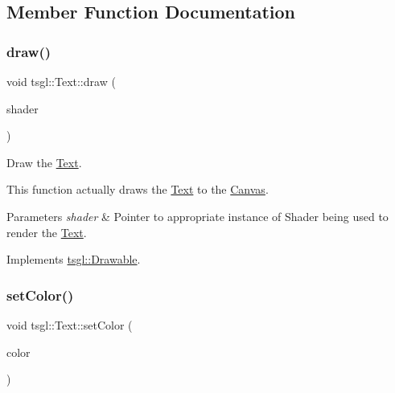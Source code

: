 \subsection{Member Function Documentation}
\mbox{\label{classtsgl_1_1_text_ab2780341c59d000487759700c23bbf93}} 
\subsubsection{\texorpdfstring{draw()}{draw()}}
{\footnotesize\ttfamily void tsgl\+::\+Text\+::draw (\begin{DoxyParamCaption}\item[{Shader $\ast$}]{shader }\end{DoxyParamCaption})\hspace{0.3cm}{\ttfamily [virtual]}}



Draw the \hyperlink{classtsgl_1_1_text}{Text}. 

This function actually draws the \hyperlink{classtsgl_1_1_text}{Text} to the \hyperlink{classtsgl_1_1_canvas}{Canvas}. 
\begin{DoxyParams}{Parameters}
{\em shader} & Pointer to appropriate instance of Shader being used to render the \hyperlink{classtsgl_1_1_text}{Text}. \\
\hline
\end{DoxyParams}


Implements \hyperlink{classtsgl_1_1_drawable}{tsgl\+::\+Drawable}.

\mbox{\label{classtsgl_1_1_text_a524c1aa3044dea3c7f20f9aa67d223de}} 
\subsubsection{\texorpdfstring{set\+Color()}{setColor()}}
{\footnotesize\ttfamily void tsgl\+::\+Text\+::set\+Color (\begin{DoxyParamCaption}\item[{const \hyperlink{structtsgl_1_1_color_float}{Color\+Float} \&}]{color }\end{DoxyParamCaption})\hspace{0.3cm}{\ttfamily [virtual]}}



